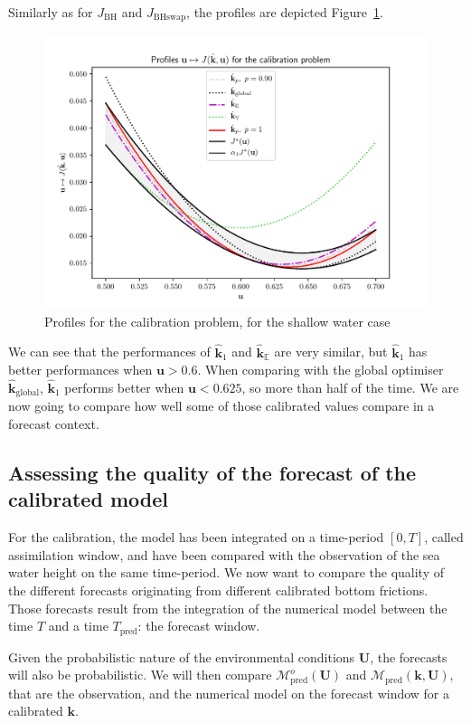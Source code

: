 \documentclass[preprint, review, 1p]{elsarticle}
\newcommand{\Ex}{\mathbb{E}}
\newcommand{\hatkmean}{\hat{\mathbf{k}}_{\Ex}}
\newcommand{\kest}{\hat{\mathbf{k}}}
\newcommand{\JBH}{J_{\mathrm{BH}}}
\newcommand{\JBHS}{J_{\mathrm{BHswap}}}
\newlength{\onehalfcolumn}
\begin{document}
Similarly as for $\JBH$ and $\JBHS$, the profiles are depicted Figure~\ref{fig:profiles_swe}.
\begin{figure}[!h]
  \centering
  \includegraphics[width=\onehalfcolumn]{Figures/FIG12}
  \caption{Profiles for the calibration problem, for the shallow water case}
\label{fig:profiles_swe}
\end{figure}


We can see that the performances of $\kest_1$ and $\hatkmean$ are very similar, but $\kest_1$ has better performances when $\mathbf{u} > 0.6$. When comparing with the global optimiser $\kest_{\mathrm{global}}$, $\kest_1$ performs better when $\mathbf{u}<0.625$, so more than half of the time.
We are now going to compare how well some of those calibrated values compare in a forecast context.


\subsection{Assessing the quality of the forecast of the calibrated model}
For the calibration, the model has been integrated on a time-period $[0, T]$, called assimilation window, and have been compared with the observation of the sea water height on the same time-period.
We now want to compare the quality of the different forecasts originating from different calibrated bottom frictions.
Those forecasts result from the integration of the numerical model between the time $T$ and a time $T_{\mathrm{pred}}$: the forecast window.

Given the probabilistic nature of the environmental conditions $\mathbf{U}$, the forecasts will also be probabilistic. We will then compare $\mathcal{M}_{\mathrm{pred}}^o(\mathbf{U})$ and $\mathcal{M}_{\mathrm{pred}}(\mathbf{k},\mathbf{U})$, that are the observation, and the numerical model on the forecast window for a calibrated $\mathbf{k}$.
\end{document}
